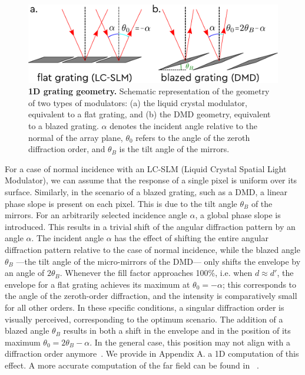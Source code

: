 \documentclass[12pt]{iopart}
\begin{document}
\begin{figure}
  \centering
  \includegraphics[width = \textwidth]{images/grating_geom.pdf}
  \caption{
    \textbf{1D grating geometry.}
    Schematic representation of the geometry of two types of modulators:
    (a) the liquid crystal modulator, equivalent to a flat grating,
    and (b) the DMD geometry, equivalent to a blazed grating.
    $\alpha$ denotes the incident angle relative to the normal of the array plane,
    $\theta_0$ refers to the angle of the zeroth diffraction order,
    and $\theta_B$ is the tilt angle of the mirrors.\\
  }
  \label{fig:grating_geom}
\end{figure}


For a case of normal incidence with an LC-SLM (Liquid Crystal Spatial Light Modulator),
we can assume that the response of a single pixel is uniform over its surface.
Similarly, in the scenario of a blazed grating,
such as a DMD, a linear phase slope is present on each pixel.
This is due to the tilt angle $\theta_B$ of the mirrors.
For an arbitrarily selected incidence angle $\alpha$,
a global phase slope is introduced.
This results in a trivial shift of the angular diffraction pattern by an angle $\alpha$.
The incident angle $\alpha$ has the effect of shifting the entire angular diffraction pattern
relative to the case of normal incidence,
while the blazed angle $\theta_B$
—the tilt angle of the micro-mirrors of the DMD—
only shifts the envelope by an angle of $2\theta_B$.
Whenever the fill factor approaches 100\%,
i.e. when $d \approx d'$,
the envelope for a flat grating achieves its maximum at $\theta_0 = -\alpha$;
this corresponds to the angle of the zeroth-order diffraction,
and the intensity is comparatively small for all other orders.
In these specific conditions, a singular diffraction order is visually perceived, corresponding to the optimum scenario.
The addition of a blazed angle $\theta_B$ results in both
a shift in the envelope and in the position of its maximum 
$\theta_0 = 2\theta_B - \alpha$.
In the general case,
this position may not align with a diffraction order anymore~\cite{Park2015properties}.
We provide in Appendix A.  a 1D computation of this effect.
A more accurate computation of the far field can be found  in ~\cite{Wang2023diffraction}.\\
\end{document}

